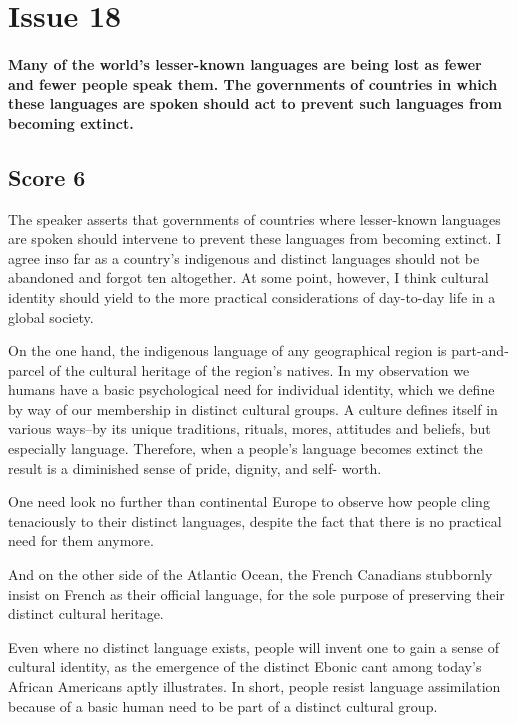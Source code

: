 \section{Issue 18}
\paragraph{
Many of the world's lesser-known languages are being lost as fewer and fewer people speak them. The governments of countries in which these languages are spoken should act to prevent such languages from becoming extinct.
}
\subsection{Score 6}


The speaker asserts that governments of countries where lesser-known languages are spoken should intervene to prevent these languages from becoming extinct.
I agree inso far as a country's indigenous and distinct languages should not be abandoned and forgot ten altogether.
At some point, however, I think cultural identity should yield to the more practical considerations of day-to-day life in a global society.


On the one hand, the indigenous language of any geographical region is part-and-parcel of the cultural heritage of the region's natives.
In my observation we humans have a basic psychological need for individual identity, which we define by way of our membership in distinct cultural groups.
A culture defines itself in various ways--by its unique traditions, rituals, mores, attitudes and beliefs, but especially language.
Therefore, when a people's language becomes extinct the result is a diminished sense of pride, dignity, and self- worth.


One need look no further than continental Europe to observe how people cling tenaciously to their distinct languages, despite the fact that there is no practical need for them anymore.


And on the other side of the Atlantic Ocean, the French Canadians stubbornly insist on French as their official language, for the sole purpose of preserving their distinct cultural heritage.


Even where no distinct language exists, people will invent one to gain a sense of cultural identity, as the emergence of the distinct Ebonic cant among today's African Americans aptly illustrates.
In short, people resist language assimilation because of a basic human need to be part of a distinct cultural group.


